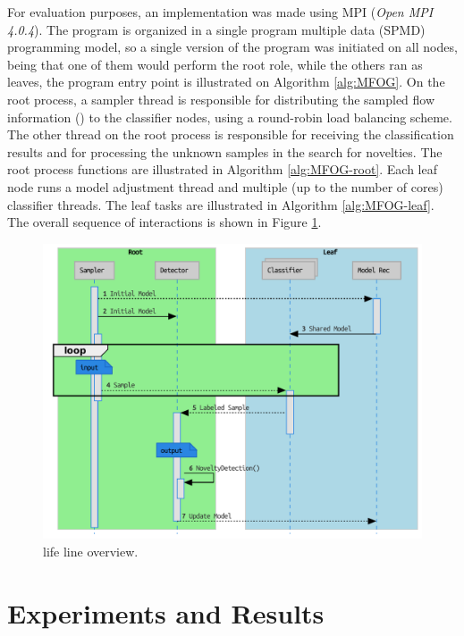 For evaluation purposes, an \mfog implementation was made using MPI (\emph{Open
MPI 4.0.4}).
The program is organized in a single program multiple data (SPMD)
programming model, so a single version of the \mfog program was initiated on all
nodes, being that one of them would perform the root role, while the others ran
as leaves, the program entry point is illustrated on Algorithm \ref{alg:MFOG}.
On the root process, a sampler thread is responsible for distributing the
sampled flow information (\val) to the classifier nodes, using a round-robin
load balancing scheme.
The other thread on the root process is responsible for receiving the
classification results and for processing the unknown samples in the search for
novelties.
The root process functions are illustrated in Algorithm \ref{alg:MFOG-root}.
Each leaf node runs a model adjustment thread and multiple (up to the number of
cores) classifier threads. The leaf tasks are illustrated in Algorithm
\ref{alg:MFOG-leaf}.
The overall sequence of interactions is shown in Figure \ref{fig:mfog-mpi-life}.

\begin{figure}[htb]
  \centerline{
    \includegraphics[width=\linewidth,page=1]{figures/lifecycle-uml-svg.pdf}
  }
  \caption{\mfog life line overview.}
  \label{fig:mfog-mpi-life}
\end{figure}


\section{Experiments and Results}
\label{sec:experiments}

